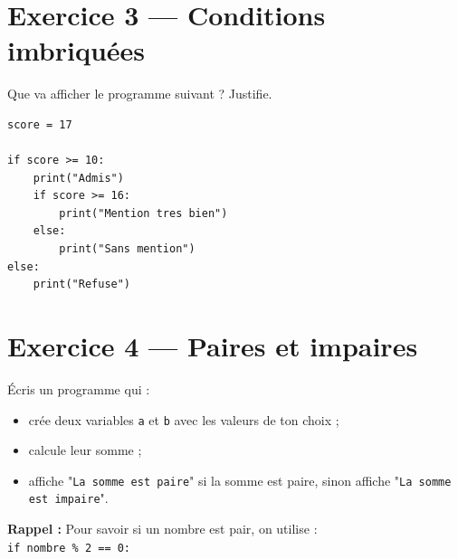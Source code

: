 \documentclass[9pt,a4paper]{article}
\begin{document}
\begin{tcolorbox}[colframe=black, colback=white, width=\linewidth]
\vspace{5cm}
\end{tcolorbox}

\vspace{1cm}

\section*{Exercice 3 — Conditions imbriquées}

\noindent Que va afficher le programme suivant ? Justifie.

\begin{lstlisting}
score = 17

if score >= 10:
    print("Admis")
    if score >= 16:
        print("Mention tres bien")
    else:
        print("Sans mention")
else:
    print("Refuse")
\end{lstlisting}

\begin{tcolorbox}[colframe=black, colback=white, width=\linewidth]
\vspace{4cm}
\end{tcolorbox}

\vspace{1cm}

\section*{Exercice 4 — Paires et impaires}

\noindent Écris un programme qui :
\begin{itemize}
    \item crée deux variables \texttt{a} et \texttt{b} avec les valeurs de ton choix ;
    \item calcule leur somme ;
    \item affiche "\texttt{La somme est paire}" si la somme est paire, sinon affiche "\texttt{La somme est impaire}".
\end{itemize}

\begin{tcolorbox}[colframe=black, colback=white, width=\linewidth]
\vspace{5cm}
\end{tcolorbox}

\vspace{0.3cm}
\textbf{Rappel :} Pour savoir si un nombre est pair, on utilise : \\
\texttt{if nombre \% 2 == 0:}
\end{document}
